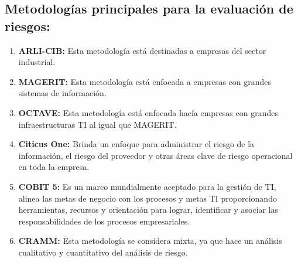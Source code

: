 \subsection{Metodologías principales para la evaluación de riesgos:}
\begin{enumerate}
\item {\bfseries ARLI-CIB:}
Esta metodología está destinadas a empresas del sector industrial.
\item {\bfseries MAGERIT:}
Esta metodología está enfocada a empresas con grandes sistemas de información.
\item {\bfseries OCTAVE:}
Esta metodología está enfocada hacía empresas con grandes infraestructuras TI al igual que MAGERIT.
\item {\bfseries Citicus One:}
Brinda un enfoque para administrar el riesgo de la información, el riesgo del proveedor y otras áreas clave de riesgo operacional en toda la empresa.
\item {\bfseries COBIT 5:}
Es un marco mundialmente aceptado para la gestión de TI, alinea las metas de negocio con los procesos y metas TI proporcionando herramientas, recursos y orientación para lograr, identificar y asociar las responsabilidades de los procesos  empresariales.
\item {\bfseries CRAMM:}
Esta metodología se considera mixta, ya que hace un análisis cualitativo y cuantitativo del análisis de riesgo.
\end{enumerate}



